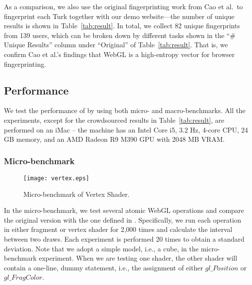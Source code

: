  
 As a comparison, we also use the original fingerprinting work from Cao et al.\ to fingerprint each Turk together with our demo website---the number of unique results is shown in Table~\ref{tab:result}.  In total, we collect 82 unique fingerprints from 139 users, which can be broken down by different tasks shown in the ``\# Unique Results'' column under ``Original'' of Table~\ref{tab:result}.  That is, we confirm Cao et al.'s findings that WebGL is a high-entropy vector for browser fingerprinting. 


\subsection{Performance} \label{subsec:per}


We test the performance of \sys by using both micro- and macro-benchmarks.  All the experiments, except for the crowdsourced results in Table~\ref{tab:result}, are performed on an iMac -- the machine has an Intel Core i5, 3.2 Hz, 4-core CPU, 24 GB memory, and an AMD Radeon R9 M390 GPU with 2048 MB VRAM. 




\subsubsection{Micro-benchmark}


\begin{figure}
\centering
\texttt{[image: vertex.eps]} %
\vspace{-0.35in}
\caption{Micro-benchmark of Vertex Shader. }
\label{fig:vertex}
\vspace{-0.15in}
\end{figure} 

In the micro-benchmark, we test several atomic WebGL operations and compare the original version with the one defined in \sys.  Specifically, we run each operation in either fragment or vertex shader for 2,000 times and calculate the interval between two draws.  Each experiment is performed 20 times to obtain a standard deviation.  Note that we adopt a simple model, i.e., a cube, in the micro-benchmark experiment.  When we are testing one shader, the other shader will contain a one-line, dummy statement, i.e., the assignment of either $gl\_Position$ or $gl\_FragColor$. 





